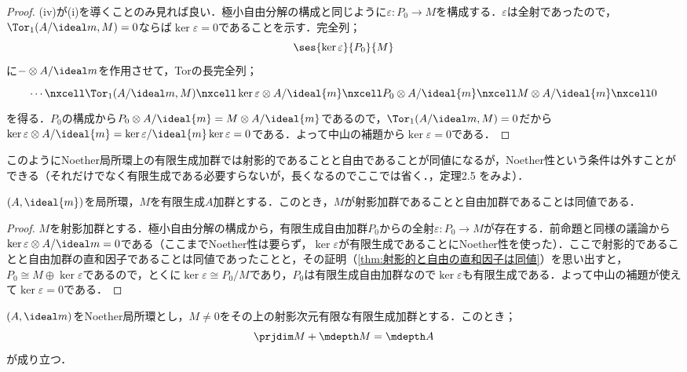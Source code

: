 \begin{proof}
	(iv)が(i)を導くことのみ見れば良い．極小自由分解の構成と同じように$\varepsilon:P_0\to M$を構成する．$\varepsilon$は全射であったので，$\Tor_1(A/\ideal m,M)=0$ならば$\ker\varepsilon=0$であることを示す．完全列；
	\[\ses{\ker\varepsilon}{P_0}{M}\]
	に$-\otimes A/\ideal m$を作用させて，Torの長完全列；
	\[\begin{tikzcd}
	\cdots\nxcell\Tor_1(A/\ideal m,M)\nxcell\ker\varepsilon\otimes A/\ideal{m}\nxcell P_0\otimes A/\ideal{m}\nxcell M\otimes A/\ideal{m}\nxcell0
	\end{tikzcd}\]
	を得る．$P_0$の構成から$P_0\otimes A/\ideal{m}=M\otimes A/\ideal{m}$であるので，$\Tor_1(A/\ideal m,M)=0$だから$\ker\varepsilon\otimes A/\ideal{m}=\ker\varepsilon/\ideal{m}\ker\varepsilon=0$である．よって中山の補題から$\ker\varepsilon=0$である．
\end{proof}

このようにNoether局所環上の有限生成加群では射影的であることと自由であることが同値になるが，Noether性という条件は外すことができる（それだけでなく有限生成である必要すらないが，長くなるのでここでは省く．\cite{Matsumura1980}，定理2.5 をみよ）．

\begin{thm}
	$(A,\ideal{m})$を局所環，$M$を有限生成$A$加群とする．このとき，$M$が射影加群であることと自由加群であることは同値である．
\end{thm}

\begin{proof}
	$M$を射影加群とする．極小自由分解の構成から，有限生成自由加群$P_0$からの全射$\varepsilon:P_0\to M$が存在する．前命題と同様の議論から$\ker\varepsilon\otimes A/\ideal m=0$である（ここまでNoether性は要らず，$\ker\varepsilon$が有限生成であることにNoether性を使った）．ここで射影的であることと自由加群の直和因子であることは同値であったことと，その証明（\ref{thm:射影的と自由の直和因子は同値}）を思い出すと，$P_0\cong M\oplus\ker\varepsilon$であるので，とくに$\ker\varepsilon\cong P_0/M$であり，$P_0$は有限生成自由加群なので$\ker\varepsilon$も有限生成である．よって中山の補題が使えて$\ker\varepsilon=0$である．
\end{proof}

\begin{thm}\label{thm:Auslander--Buchsbaumの公式}
	$(A,\ideal m)$をNoether局所環とし，$M\neq 0$をその上の射影次元有限な有限生成加群とする．このとき；
	\[\prjdim M+\mdepth M=\mdepth A\]
	が成り立つ．
\end{thm}

